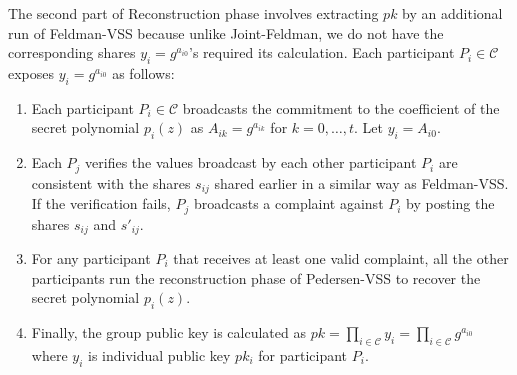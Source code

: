 \documentclass[letterpaper,twocolumn,10pt]{article}
\theoremstyle{definition}
\theoremstyle{remark}
\begin{document}
\begin{itemize}
\begin{enumerate}
    The second part of Reconstruction phase involves extracting $pk$ by an additional run of Feldman-VSS because unlike Joint-Feldman, we do not have the corresponding shares $y_i = g^{a_{i0}}$'s required its calculation. Each participant $P_i \in \mathcal{C}$ exposes $y_i = g^{a_{i0}}$ as follows:
        \begin{enumerate}
            \item Each participant $P_i \in \mathcal{C}$ broadcasts the commitment to the coefficient of the secret polynomial $p_i(z)$ as $A_{ik} = g^{a_{ik}}$ for $k = 0, \ldots, t$. Let $y_i = A_{i0}$.
            \item Each $P_j$ verifies the values broadcast by each other participant $P_i$ are consistent with the shares $s_{ij}$ shared earlier in a similar way as Feldman-VSS. If the verification fails, $P_j$ broadcasts a complaint against $P_i$ by posting the shares $s_{ij}$ and $s'_{ij}$.
            \item For any participant $P_i$ that receives at least one valid complaint, all the other participants run the reconstruction phase of Pedersen-VSS to recover the secret polynomial $p_i(z)$. 
            \item Finally, the group public key is calculated as $pk = \prod_{i \in \mathcal{C}} y_i = \prod_{i \in \mathcal{C}} g^{a_{i0}}$ where $y_i$ is individual public key $pk_i$ for participant $P_i$.
        \end{enumerate}
    \end{enumerate}
\end{itemize}
\fi

\iffalse
\end{document}
